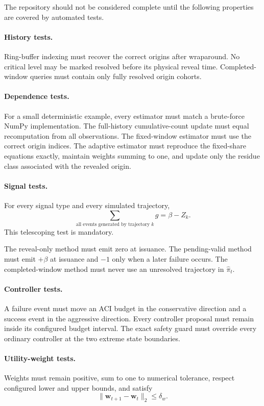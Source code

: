 \documentclass[11pt]{article}
\begin{document}
The repository should not be considered complete until the following
properties are covered by automated tests.

\paragraph{History tests.}
Ring-buffer indexing must recover the correct origins after wraparound.
No critical level may be marked resolved before its physical reveal time.
Completed-window queries must contain only fully resolved origin cohorts.

\paragraph{Dependence tests.}
For a small deterministic example, every estimator must match a brute-force
NumPy implementation.  The full-history cumulative-count update must equal
recomputation from all observations.  The fixed-window estimator must use the
correct origin indices.  The adaptive estimator must reproduce the
fixed-share equations exactly, maintain weights summing to one, and update
only the residue class associated with the revealed origin.

\paragraph{Signal tests.}
For every signal type and every simulated trajectory,
\[
    \sum_{\text{all events generated by trajectory }k}
    g
    =
    \beta-Z_k.
\]
This telescoping test is mandatory.

The reveal-only method must emit zero at issuance.  The pending-valid method
must emit $+\beta$ at issuance and $-1$ only when a later failure occurs.
The completed-window method must never use an unresolved trajectory in
$\widehat\pi_t$.

\paragraph{Controller tests.}
A failure event must move an ACI budget in the conservative direction and a
success event in the aggressive direction.  Every controller proposal must
remain inside its configured budget interval.  The exact safety guard must
override every ordinary controller at the two extreme state boundaries.

\paragraph{Utility-weight tests.}
Weights must remain positive, sum to one to numerical tolerance, respect
configured lower and upper bounds, and satisfy
\[
    \|
        \bm w_{t+1}-\bm w_t
    \|_2
    \le
    \delta_w.
\]
\end{document}
